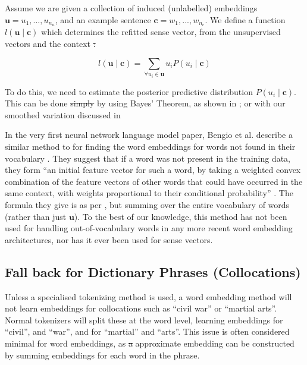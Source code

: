 \documentclass{sig-alternate}
\renewcommand{\c}{\mathbf{c}}
\renewcommand{\u}{\mathbf{u}}
\providecommand{\DIFadd}[1]{{\protect\color{blue}\uwave{#1}}} %
\providecommand{\DIFdel}[1]{{\protect\color{red}\sout{#1}}}                      %
\providecommand{\DIFaddbegin}{} %
\providecommand{\DIFaddend}{} %
\providecommand{\DIFdelbegin}{} %
\providecommand{\DIFdelend}{} %
\begin{document}
Assume we are given a collection of induced (unlabelled) embeddings $\u={u_1,...,u_{n_u}}$, and an example sentence $\c={w_1,...,w_{n_c}}$. We define a function $l(\u \mid \c )$ which determines the refitted sense vector, from the unsupervised vectors and the context \DIFdelbegin \DIFdel{:
}%

\DIFdelend \DIFaddbegin \DIFadd{as
}\DIFaddend \begin{equation} \label{eq:synth}
l(\u \mid \c ) = \sum_{\forall u_i \in \u} u_i P(u_i \mid \c)
\end{equation}

To do this, we need to estimate the posterior predictive distribution $P(u_i \mid \c)$.
This can be done \DIFdelbegin \DIFdel{simply }\DIFdelend by using Bayes' Theorem, as shown in ; or with our smoothed variation discussed in 


In the very first neural network language model paper, Bengio et al. \DIFaddbegin \parencite{NPLM} \DIFaddend describe a similar method to  for finding the word embeddings for words not found in their vocabulary\DIFdelbegin %
\DIFdelend . They suggest that if a word was not present in the training data, they form \enquote{an initial feature vector for such a word, by taking a weighted convex combination of the feature vectors of other words that could have occurred in the same context, with weights proportional to their conditional probability} \parencite{NPLM}\DIFdelbegin %
\DIFdelend . The formula they give is as per , but summing over the entire vocabulary of words (rather than just $\u$). To the best of our knowledge, this method has not been used for handling out-of-vocabulary words in any more recent word embedding architectures, nor has it ever been used for sense vectors.


\subsection {Fall back for Dictionary Phrases (Collocations)}
Unless a specialised tokenizing method is used, a word embedding method will not learn embeddings for collocations such as ``civil war'' or ``martial arts''. Normal tokenizers will split these at the word level, learning embeddings for ``civil'', and ``war'', and for ``martial'' and ``arts''. This issue is often considered minimal for word embeddings, as \DIFdelbegin \DIFdel{a }\DIFdelend \DIFaddbegin \DIFadd{an }\DIFaddend approximate embedding can be constructed by summing embeddings for each word in the phrase.
\end{document}
